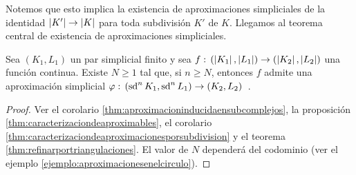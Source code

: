 Notemos que esto implica la existencia de aproximaciones simpliciales de la
identidad $\geom{K'}\rightarrow\geom{K}$ para toda subdivisi\'{o}n $K'$ de $K$.
Llegamos al teorema central de existencia de aproximaciones simpliciales.

\begin{teoExistenciaDeAproximaciones}\label{thm:existenciadeaproximaciones}
	Sea $(K_{1},L_{1})$ un par simplicial finito y sea
	\begin{math}
		f:\,(\geom{K_{1}},\geom{L_{1}})\rightarrow
			(\geom{K_{2}},\geom{L_{2}})
	\end{math}
	una funci\'{o}n continua. Existe $N\geq 1$ tal que, si $n\geq N$,
	entonces $f$ admite una aproximaci\'{o}n simplicial
	\begin{math}
		\varphi:\,(\subdiv[n]{K_{1}},\subdiv[n]{L_{1}})\rightarrow
			(K_{2},L_{2})
	\end{math}~.
\end{teoExistenciaDeAproximaciones}

\begin{proof}
	Ver el corolario \ref{thm:aproximacioninducidaensubcomplejos},
	la proposici\'{o}n \ref{thm:caracterizaciondeaproximables},
	el corolario \ref{thm:caracterizaciondeaproximacionesporsubdivision} y
	el teorema \ref{thm:refinarportriangulaciones}.
	El valor de $N$ depender\'{a} del codominio (ver el ejemplo
	\ref{ejemplo:aproximacionesenelcirculo}).
\end{proof}
